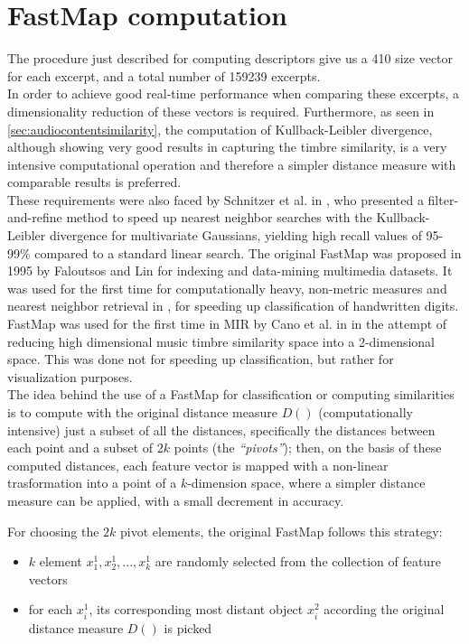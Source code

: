 \section{FastMap computation}
\label{sec:fastmap}
The procedure just described for computing descriptors give us a 410 size vector for each excerpt, and a total number of 159239 excerpts.\\
In order to achieve good real-time performance when comparing these excerpts, a dimensionality reduction of these vectors is required. Furthermore, as seen in \ref{sec:audiocontentsimilarity}, the computation of Kullback-Leibler divergence, although showing very good results in capturing the timbre similarity, is a very intensive computational operation and therefore a simpler distance measure with comparable results is preferred. \\
These requirements were also faced by Schnitzer et al. in \cite{fastmap12}, who presented a filter-and-refine method to speed up nearest neighbor searches with the Kullback-Leibler divergence for multivariate Gaussians, yielding high recall values of 95-99\% compared to a standard linear search. The original FastMap was proposed in 1995 by Faloutsos and Lin \cite{falo95} for indexing and data-mining multimedia datasets. It was used for the first time for computationally heavy, non-metric measures and nearest neighbor retrieval in \cite{athi04}, for speeding up classification of handwritten digits. FastMap was used for the first time in MIR by Cano et al. in \cite{cano02} in the attempt of reducing high dimensional music timbre similarity space into a 2-dimensional space. This was done not for speeding up classification, but rather for visualization purposes. \\
The idea behind the use of a FastMap for classification or computing similarities is to compute with the original distance measure $D()$ (computationally intensive) just a subset of all the distances, specifically the distances between each point and a subset of $2k$ points (the \textit{``pivots''}); then, on the basis of these computed distances, each feature vector is mapped with a non-linear trasformation into a point of a $k$-dimension space, where a simpler distance measure can be applied, with a small decrement in accuracy.

For choosing the $2k$ pivot elements, the original FastMap \cite{falo95} follows this strategy:
\begin{itemize}
\item $k$ element $x_1^1, x_2^1, ..., x_k^1$ are randomly selected from the collection of feature vectors
\item for each $x_i^1$, its corresponding most distant object $x_i^2$ according the original distance measure $D()$ is picked
\end{itemize}

